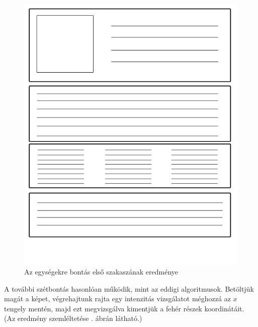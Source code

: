 \begin{figure}[h!]
\centering
\includegraphics[scale=0.8]{images/page2.png}
\caption{Az egységekre bontás első szakaszának eredménye}
\label{fig:page2}
\end{figure}

A további szétbontás hasonlóan működik, mint az eddigi algoritmusok. Betöltjük magát a képet, végrehajtunk rajta egy intenzitás vizsgálatot méghozzá az $x$ tengely mentén, majd ezt megvizsgálva kimentjük a fehér részek koordinátáit. (Az eredmény szemléltetése . ábrán látható.)

